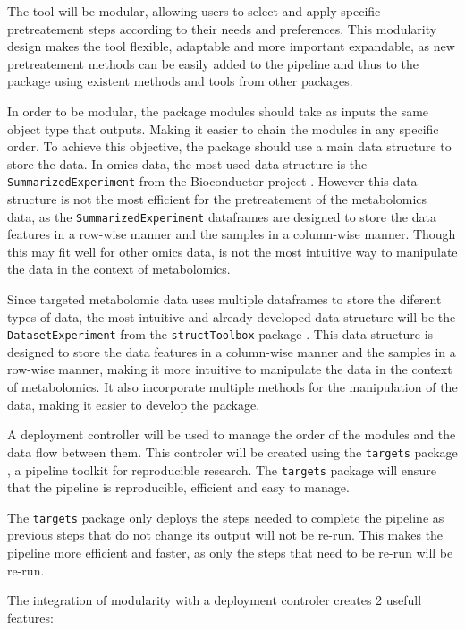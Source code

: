 \documentclass[ENG, BIB]{TFUOC}%
\begin{document}
The tool will be modular, allowing users to select and apply specific pretreatement steps according to their needs and preferences. This modularity design makes the tool flexible, adaptable and more important expandable, as new pretreatement methods can be easily added to the pipeline and thus to the package using existent methods and tools from other packages.

In order to be modular, the package modules should take as inputs the same object type that outputs. Making it easier to chain the modules in any specific order. To achieve this objective, the package should use a main data structure to store the data. In omics data, the most used data structure is the \texttt{SummarizedExperiment} from the Bioconductor project \cite{R-SummarizedExperiment}. However this data structure is not the most efficient for the pretreatement of the metabolomics data, as the \texttt{SummarizedExperiment} dataframes are designed to store the data features in a row-wise manner and the samples in a column-wise manner. Though this may fit well for other omics data, is not the most intuitive way to manipulate the data in the context of metabolomics.

Since targeted metabolomic data uses multiple dataframes to store the diferent types of data, the most intuitive and already developed data structure will be the \texttt{DatasetExperiment} from the \texttt{structToolbox} package \cite{structToolbox2020}. This data structure is designed to store the data features in a column-wise manner and the samples in a row-wise manner, making it more intuitive to manipulate the data in the context of metabolomics. It also incorporate multiple methods for the manipulation of the data, making it easier to develop the package.

A deployment controller will be used to manage the order of the modules and the data flow between them. This controler will be created using the \texttt{targets} package \cite{targets2021}, a pipeline toolkit for reproducible research. The \texttt{targets} package will ensure that the pipeline is reproducible, efficient and easy to manage.

The \texttt{targets} package only deploys the steps needed to complete the pipeline as previous steps that do not change its output will not be re-run. This makes the pipeline more efficient and faster, as only the steps that need to be re-run will be re-run.

The integration of modularity with a deployment controler creates 2 usefull features:
\end{document}
